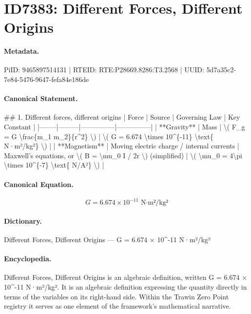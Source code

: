 \section*{ID7383: Different Forces, Different Origins}
\paragraph{Metadata.}
PiID: 9465897514131 | RTEID: RTE:P28669.8286:T3.2568 | UUID: 5d7a35c2-7e84-5476-9647-fefa84e186de

\paragraph{Canonical Statement.}
\#\# 1. Different forces, different origins | Force | Source | Governing Law | Key Constant | |--------|---------|---------------|---------------| | **Gravity** | Mass | \textbackslash{}( F\_g = G \textbackslash{}frac\{m\_1 m\_2\}\{r\textasciicircum{}2\} \textbackslash{}) | \textbackslash{}( G = 6.674 \textbackslash{}times 10\textasciicircum{}\{-11\} \textbackslash{}text\{ N·m²/kg²\} \textbackslash{}) | | **Magnetism** | Moving electric charge / internal currents | Maxwell’s equations, or \textbackslash{}( B = \textbackslash{}mu\_0 I / 2r \textbackslash{}) (simplified) | \textbackslash{}( \textbackslash{}mu\_0 = 4\textbackslash{}pi \textbackslash{}times 10\textasciicircum{}\{-7\} \textbackslash{}text\{ N/A²\} \textbackslash{}) |

\paragraph{Canonical Equation.}
\[
G = 6.674 \times 10^{-11} \text{ N·m²/kg²}
\]

\paragraph{Dictionary.}
Different Forces, Different Origins — G = 6.674 × 10\textasciicircum{}-11 N·m²/kg²

\paragraph{Encyclopedia.}
Different Forces, Different Origins is an algebraic definition, written G = 6.674 × 10\textasciicircum{}-11 N·m²/kg². It is an algebraic definition expressing the quantity directly in terms of the variables on its right-hand side. Within the Trawin Zero Point registry it serves as one element of the framework's mathematical narrative.
